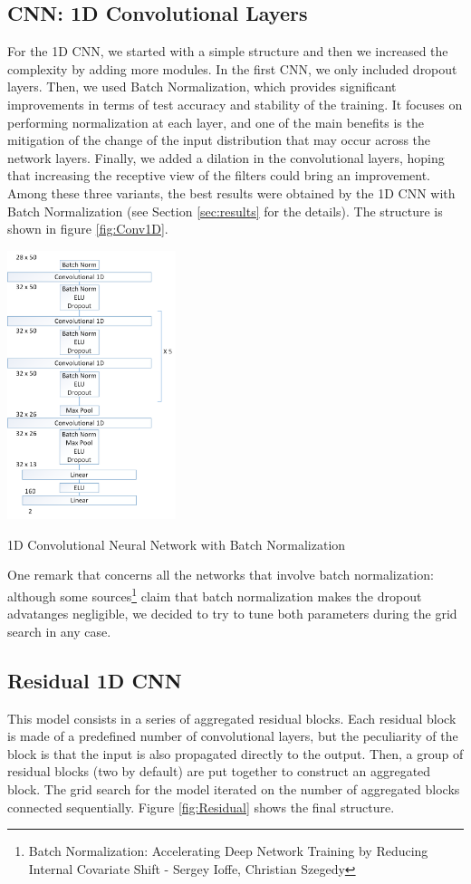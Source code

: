 \documentclass[10pt,conference,compsocconf]{IEEEtran}
\begin{document}
\subsection{CNN: 1D Convolutional Layers}
For the 1D CNN, we started with a simple structure and then we increased the complexity by adding more modules. In the first CNN, we only included dropout layers. Then, we used Batch Normalization, which provides significant improvements in terms of test accuracy and stability of the training. It focuses on performing normalization at each layer, and one of the main benefits is the mitigation of the change of the input distribution that may occur across the network layers. Finally, we added a dilation in the convolutional layers, hoping that increasing the receptive view of the filters could bring an improvement. Among these three variants, the best results were obtained by the 1D CNN with Batch Normalization (see Section \ref{sec:results} for the details). The structure is shown in figure \ref{fig:Conv1D}.

\begin{center}
	\captionsetup{type=figure}
	\includegraphics[width=0.37\textwidth]{img/Conv1DBatchNorm.png}
	\caption {1D Convolutional Neural Network with Batch Normalization}
	\label{fig:Conv1D}
\end{center}

One remark that concerns all the networks that involve batch normalization: although some sources\footnote{Batch Normalization: Accelerating Deep Network Training by Reducing Internal Covariate Shift - Sergey Ioffe, Christian Szegedy} claim that batch normalization makes the dropout advatanges negligible, we decided to try to tune both parameters during the grid search in any case.


\subsection{Residual 1D CNN}
This model consists in a series of aggregated residual blocks. Each residual block is made of a predefined number of convolutional layers, but the peculiarity of the block is that the input is also propagated directly to the output. Then, a group of residual blocks (two by default) are put together to construct an aggregated block. The grid search for the model iterated on the number of aggregated blocks connected sequentially. Figure \ref{fig:Residual} shows the final structure.
\end{document}
